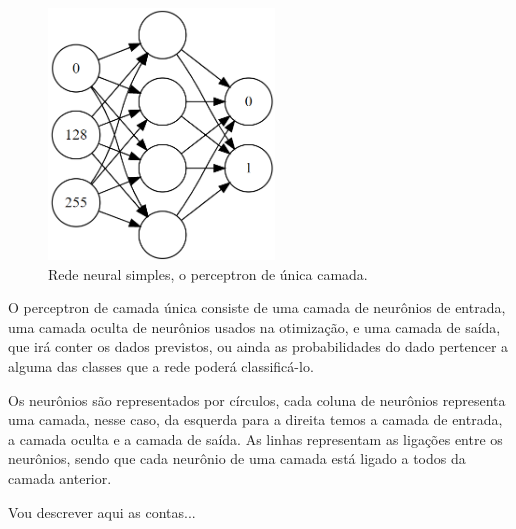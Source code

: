 \begin{figure}[htb]
\centering
\includegraphics[width=6cm]{figuras/perceptron}
\caption{\label{fig:perceptron}Rede neural simples, o perceptron de única camada. }
\end{figure}

O perceptron de camada única consiste de uma camada de neurônios de entrada, uma camada oculta de neurônios usados na otimização, e uma camada de saída, que irá conter os dados previstos, ou ainda as probabilidades do dado pertencer a alguma das classes que a rede poderá classificá-lo.

Os neurônios são representados por círculos, cada coluna de neurônios representa uma camada, nesse caso, da esquerda para a direita temos a camada de entrada, a camada oculta e a camada de saída. As linhas representam as ligações entre os neurônios, sendo que cada neurônio de uma camada está ligado a todos da camada anterior.

Vou descrever aqui as contas...